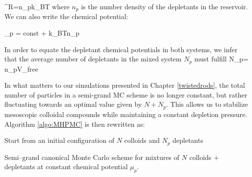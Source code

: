 \beq
\Pi^R=n_pk_BT
\eeq
where $n_p$ is the number density of the depletants in the reservoir. We can also write the chemical potential:

\beq
\mu_p = \textrm{const} + k_BT\ln n_p
\eeq

In order to equate the depletant chemical potentials in both systems, we infer that the average number of depletants in the mixed system $N_p$ must fulfill
\beq
N_p= n_p\langle V_{free} \rangle
\eeq

In what matters to our simulations presented in Chapter \ref{twistedrods}, the total number of particles in a semi-grand MC scheme is no longer constant, but rather fluctuating towards an optimal value given by $N + N_p$. This allows us to stabilize mesoscopic colloidal compounds while maintaining a constant depletion pressure. Algorithm \ref{algo:MHPMC} is then rewritten as:

\begin{algorithm}[h]
    \SetAlgoLined

    Start from an initial configuration of $N$ colloids and $N_p$ depletants\;
    \caption{Semi--grand canonical Monte Carlo scheme for mixtures of $N$ colloids $+$ depletants at constant chemical potential $\mu_p$. }
    \label{algo:semiHPMC}
\end{algorithm}

